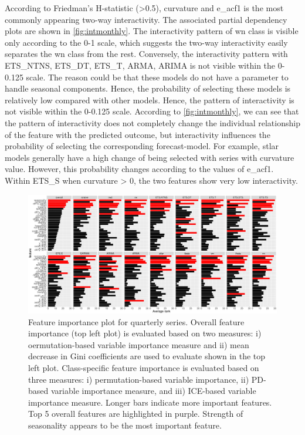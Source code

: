 \documentclass[11pt,a4paper,]{article}
\begin{document}
According to Friedman's H-statistic (\textgreater{}0.5), curvature and e\_acf1 is the most commonly appearing two-way interactivity. The associated partial dependency plots are shown in \autoref{fig:intmonthly}. The interactivity pattern of wn class is visible only according to the 0-1 scale, which suggests the two-way interactivity easily separates the wn class from the rest. Conversely, the interactivity pattern with ETS\_NTNS, ETS\_DT, ETS\_T, ARMA, ARIMA is not visible within the 0-0.125 scale. The reason could be that these models do not have a parameter to handle seasonal components. Hence, the probability of selecting these models is relatively low compared with other models. Hence, the pattern of interactivity is not visible within the 0-0.125 scale. According to \autoref{fig:intmonthly}, we can see that the pattern of interactivity does not completely change the individual relationship of the feature with the predicted outcome, but interactivity influences the probability of selecting the corresponding forecast-model. For example, stlar models generally have a high change of being selected with series with curvature value. However, this probability changes according to the values of e\_acf1. Within ETS\_S when curvature \textgreater{} 0, the two features show very low interactivity.

\begin{figure}
\centering
\includegraphics{figures/viquarterly-1.pdf}
\caption{\label{fig:viquarterly}Feature importance plot for quarterly series. Overall feature importance (top left plot) is evaluated based on two measures: i) oermutation-based variable importance measure and ii) mean decrease in Gini coefficients are used to evaluate shown in the top left plot. Class-specific feature importance is evaluated based on three measures: i) permutation-based variable importance, ii) PD-based variable importance measure, and iii) ICE-based variable importance measure. Longer bars indicate more important features. Top 5 overall features are highlighted in purple. Strength of seasonality appears to be the most important feature.}
\end{figure}
\end{document}
